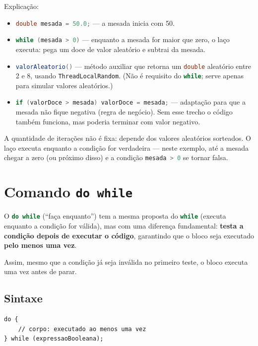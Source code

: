\documentclass[12pt,a4paper]{article}
\newcommand{\codigo}[1]{\lstinline[language=Java,basicstyle=\ttfamily\small]|#1|}
\begin{document}
Explicação:
\begin{itemize}
  \item \codigo{double mesada = 50.0;} --- a mesada inicia com 50.
  \item \codigo{while (mesada > 0)} --- enquanto a mesada for maior que zero, o
        laço executa: pega um doce de valor aleatório e subtrai da mesada.
  \item \codigo{valorAleatorio()} --- método auxiliar que retorna um \codigo{double}
        aleatório entre 2 e 8, usando \codigo{ThreadLocalRandom}. (Não é requisito
        do \codigo{while}; serve apenas para simular valores aleatórios.)
  \item \codigo{if (valorDoce > mesada) valorDoce = mesada;} --- adaptação para
        que a mesada não fique negativa (regra de negócio). Sem esse trecho o
        código também funciona, mas poderia terminar com valor negativo.
\end{itemize}

\begin{observacao}
A quantidade de iterações não é fixa: depende dos valores aleatórios sorteados.
O laço executa enquanto a condição for verdadeira --- neste exemplo, até a mesada
chegar a zero (ou próximo disso) e a condição \codigo{mesada > 0} se tornar falsa.
\end{observacao}

\section{Comando \texttt{do while}}

O \codigo{do while} (``faça enquanto'') tem a mesma proposta do \codigo{while}
(executa enquanto a condição for válida), mas com uma diferença fundamental:
\textbf{testa a condição depois de executar o código}, garantindo que o bloco seja
executado \textbf{pelo menos uma vez}.

Assim, mesmo que a condição já seja inválida no primeiro teste, o bloco executa
uma vez antes de parar.

\subsection{Sintaxe}

\begin{lstlisting}[caption={Estrutura do \texttt{do while}}]
do {
    // corpo: executado ao menos uma vez
} while (expressaoBooleana);
\end{lstlisting}
\end{document}
